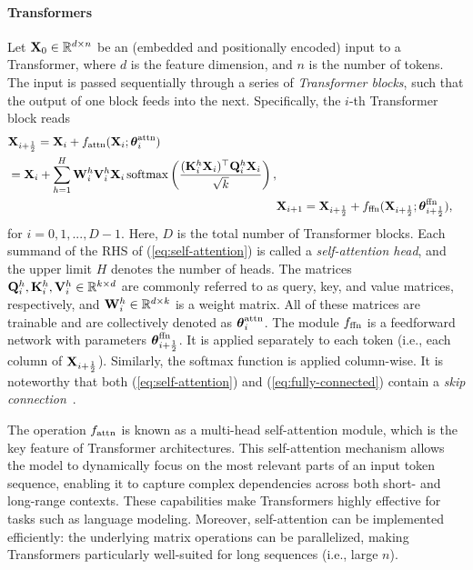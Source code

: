 \documentclass[journal]{IEEEtran}
\newcommand{\bfK}{{\bf K}}
\newcommand{\bfQ}{{\bf Q}}
\newcommand{\bfV}{{\bf V}}
\newcommand{\bfW}{{\bf W}}
\newcommand{\bfX}{{\bf X}}
\newcommand{\bftheta}{{\boldsymbol \theta}}
\theoremstyle{plain}
\theoremstyle{definition}
\theoremstyle{remark}
\begin{document}
\paragraph{Transformers} Let $\bfX_0 \in \mathbb{R}^{d \times n}$ be an (embedded and positionally encoded) input to a Transformer, where $d$ is the feature dimension, and $n$ is the number of tokens. The input is passed sequentially through a series of \emph{Transformer blocks}, such that the output of one block feeds into the next. Specifically, the $i$-th Transformer block reads
\begin{align}
\begin{split}
     &\bfX_{i+\frac{1}{2}} = \bfX_i + f_{\rm attn}(\bfX_i; \bftheta^{\rm attn}_i)  \\ & = \bfX_{i} + \sum_{h=1}^H  \bfW_i^h \bfV_i^h \bfX_i \, {\rm softmax} \left( \frac{(\bfK_i^h \bfX_i)^\top \bfQ_i^h \bfX_{i}}{\sqrt{k}} \right), \label{eq:self-attention}
     \end{split}
     \\
     &\bfX_{i+1} = \bfX_{i+\frac{1}{2}} + f_{\rm ffn}(\bfX_{i+\frac{1}{2}};\bftheta^{\rm ffn}_{i+\frac{1}{2}}), \label{eq:fully-connected}
\end{align}
for $i=0,1,...,D-1$. Here, $D$ is the total number of Transformer blocks. 
Each summand of the RHS of (\ref{eq:self-attention}) is called a \emph{self-attention head}, and the upper limit $H$ denotes the number of heads. The matrices $\bfQ_i^h,\bfK_i^h, \bfV_i^h \in \mathbb{R}^{k \times d}$ are commonly referred to as query, key, and value matrices, respectively, and $\bfW_i^h \in \mathbb{R}^{d \times k}$ is a weight matrix. All of these matrices are trainable and are collectively denoted as $\bftheta^{\rm attn}_i$. The module $f_{\rm ffn}$ is a feedforward network with parameters $\bftheta^{\rm ffn}_{i+\frac{1}{2}}$. It is applied separately to each token (i.e., each column of $\bfX_{i+\frac{1}{2}}$). Similarly, the softmax function is applied column-wise. It is noteworthy that both (\ref{eq:self-attention}) and (\ref{eq:fully-connected}) contain a \emph{skip connection}~\cite{he2016deep}.

The operation $f_{\rm attn}$ is known as a multi-head self-attention module, which is the key feature of Transformer architectures. This self-attention mechanism allows the model to dynamically focus on the most relevant parts of an input token sequence, enabling it to capture complex dependencies across both short- and long-range contexts. These capabilities make Transformers highly effective for tasks such as language modeling. Moreover, self-attention can be implemented efficiently: the underlying matrix operations can be parallelized, making Transformers particularly well-suited for long sequences (i.e., large $n$). 
\end{document}
